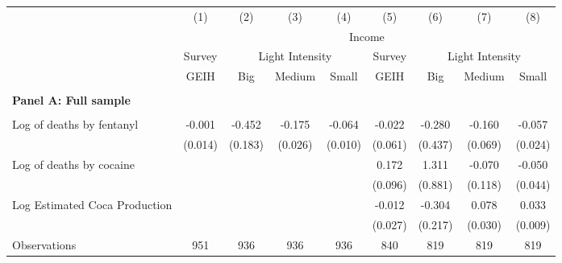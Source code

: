 \begin{tabular}{lcccccccc} \\ \hline 
                    &\multicolumn{1}{c}{(1)}         &\multicolumn{1}{c}{(2)}         &\multicolumn{1}{c}{(3)}         &\multicolumn{1}{c}{(4)}         &\multicolumn{1}{c}{(5)}         &\multicolumn{1}{c}{(6)}         &\multicolumn{1}{c}{(7)}         &\multicolumn{1}{c}{(8)}         \\
 & \multicolumn{8}{c}{Income} \\ \cline{2-5} \cline{6-9}   & Survey  &  \multicolumn{3}{c}{Light Intensity} & Survey & \multicolumn{3}{c}{Light Intensity} \\ \cline{3-5} \cline{7-9} & GEIH & Big & Medium & Small & GEIH & Big & Medium & Small \\ \hline  & & & & &  &  &  &  \\ \textbf{Panel A: Full sample} \\ & & & & & & & & \\
\rowcolor{babyblue} Log of deaths by fentanyl&      -0.001         &      -0.452\sym{**} &      -0.175\sym{***}&      -0.064\sym{***}&      -0.022         &      -0.280         &      -0.160\sym{*}  &      -0.057\sym{*}  \\
                    &     (0.014)         &     (0.183)         &     (0.026)         &     (0.010)         &     (0.061)         &     (0.437)         &     (0.069)         &     (0.024)         \\
\addlinespace
Log of deaths by cocaine&                     &                     &                     &                     &       0.172         &       1.311         &      -0.070         &      -0.050         \\
                    &                     &                     &                     &                     &     (0.096)         &     (0.881)         &     (0.118)         &     (0.044)         \\
\addlinespace
Log Estimated Coca Production&                     &                     &                     &                     &      -0.012         &      -0.304         &       0.078\sym{**} &       0.033\sym{**} \\
                    &                     &                     &                     &                     &     (0.027)         &     (0.217)         &     (0.030)         &     (0.009)         \\
\arrayrulecolor{black!10}\midrule
Observations        &         951         &         936         &         936         &         936         &         840         &         819         &         819         &         819         \\

\end{tabular}
